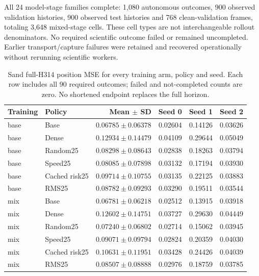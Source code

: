 All 24 model-stage families complete: 1,080 autonomous outcomes, 900 observed validation histories, 900 observed test histories and 768 clean-validation frames, totaling 3,648 mixed-stage cells. These cell types are not interchangeable rollout denominators. No required scientific outcome failed or remained uncompleted. Earlier transport/capture failures were retained and recovered operationally without rerunning scientific workers.

\begin{table}[t]
\centering\scriptsize
\caption{Sand full-H314 position MSE for every training arm, policy and seed. Each row includes all 90 required outcomes; failed and not-completed counts are zero. No shortened endpoint replaces the full horizon.}
\label{tab:sand-all-rollouts}
\setlength{\tabcolsep}{3pt}
\begin{tabular}{llrrrr}
\toprule
Training & Policy & Mean $\pm$ SD & Seed 0 & Seed 1 & Seed 2\\
\midrule
base & Base & $0.06785\pm0.06378$ & 0.02604 & 0.14126 & 0.03626\\
base & Dense & $0.12934\pm0.14479$ & 0.04109 & 0.29644 & 0.05049\\
base & Random25 & $0.08298\pm0.08643$ & 0.02838 & 0.18263 & 0.03794\\
base & Speed25 & $0.08085\pm0.07898$ & 0.03132 & 0.17194 & 0.03930\\
base & Cached risk25 & $0.09714\pm0.10755$ & 0.03135 & 0.22125 & 0.03883\\
base & RMS25 & $0.08782\pm0.09293$ & 0.03290 & 0.19511 & 0.03544\\
mix & Base & $0.06781\pm0.06218$ & 0.02512 & 0.13915 & 0.03918\\
mix & Dense & $0.12602\pm0.14751$ & 0.03727 & 0.29630 & 0.04449\\
mix & Random25 & $0.07240\pm0.06802$ & 0.02714 & 0.15062 & 0.03945\\
mix & Speed25 & $0.09071\pm0.09794$ & 0.02824 & 0.20359 & 0.04030\\
mix & Cached risk25 & $0.10631\pm0.11951$ & 0.03428 & 0.24426 & 0.04039\\
mix & RMS25 & $0.08507\pm0.08888$ & 0.02976 & 0.18759 & 0.03785\\
\bottomrule
\end{tabular}
\end{table}
